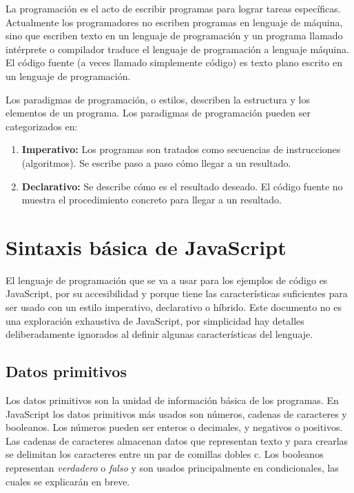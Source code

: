 \documentclass{article}
\begin{document}
La programación es el acto de escribir programas para lograr tareas específicas. Actualmente los programadores no escriben programas en lenguaje de máquina, sino que escriben texto en un lenguaje de programación y un programa llamado intérprete o compilador traduce el lenguaje de programación a lenguaje máquina\cite{compilers-and-interpreters}. El código fuente (a veces llamado simplemente código) es texto plano escrito en un lenguaje de programación.

Los paradigmas de programación, o estilos, describen la estructura y los elementos de un programa. Los paradigmas de programación pueden ser categorizados en:
\begin{enumerate}
  \item \textbf{Imperativo:} Los programas son tratados como secuencias de instrucciones (algoritmos). Se escribe paso a paso cómo llegar a un resultado.
  \item \textbf{Declarativo:} Se describe cómo es el resultado deseado. El código fuente no muestra el procedimiento concreto para llegar a un resultado.
\end{enumerate}


\section{Sintaxis básica de JavaScript}
El lenguaje de programación que se va a usar para los ejemplos de código es JavaScript, por su accesibilidad y porque tiene las características suficientes\cite{why-js} para ser usado con un estilo imperativo, declarativo o híbrido. Este documento no es una exploración exhaustiva de JavaScript, por simplicidad hay detalles deliberadamente ignorados al definir algunas características del lenguaje.

\subsection{Datos primitivos}
Los datos primitivos son la unidad de información básica de los programas. En JavaScript los datos primitivos más usados son números, cadenas de caracteres y booleanos. Los números pueden ser enteros o decimales, y negativos o positivos. Las cadenas de caracteres almacenan datos que representan texto y para crearlas se delimitan los caracteres entre un par de comillas dobles c. Los booleanos representan \textit{verdadero} o \textit{falso} y son usados principalmente en condicionales, las cuales se explicarán en breve.


\end{document}

